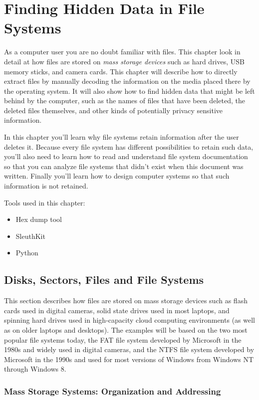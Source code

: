 

\chapter{Finding Hidden Data in File Systems}
As a computer user you are no doubt familiar with files. This
chapter look in detail at how files are stored on \emph{mass
  storage devices} such as hard drives, USB memory sticks, and camera
cards. This chapter will describe how to directly extract files by
manually decoding the information on the media placed there by the
operating system. It will also show how to find hidden data that might
be left behind by the computer, such as the names of files that have
been deleted, the deleted files themselves, and other kinds of
potentially privacy sensitive information. 

In this chapter you'll learn why file systems retain information after
the user deletes it. Because every file system has different
possibilities to retain such data, you'll also need to learn how to
read and understand file system documentation so that you can analyze
file systems that didn't exist when this document was written. Finally
you'll learn how to design computer systems so that such information
is not retained.

Tools used in this chapter:
\begin{itemize}
\item Hex dump tool
\item SleuthKit 
\item Python
\end{itemize}

\section{Disks, Sectors, Files and File Systems}
This section describes how files are stored on mass storage devices
such as flash cards used in digital cameras, solid state drives used
in most laptops, and spinning hard drives used in high-capacity cloud
computing environments (as well as on older laptops and desktops). The
examples will be based on the two most popular file systems today, the
FAT file system developed by Microsoft in the 1980s and widely used in
digital cameras, and the NTFS file system developed by Microsoft in
the 1990s and used for most versions of Windows from Windows NT
through Windows 8.

\subsection{Mass Storage Systems: Organization and Addressing}

